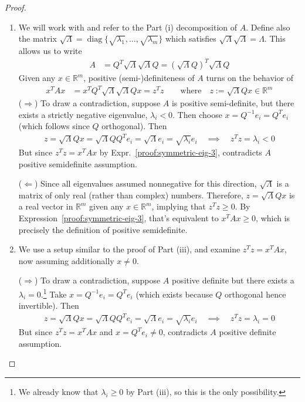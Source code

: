 \documentclass[12pt]{book}
\numberwithin{equation}{section} %
\theoremstyle{plain}
\theoremstyle{definition}
\theoremstyle{remark}
\newcommand{\diag}{\operatorname{diag}}
\newcommand{\Rm}{\mathbb{R}^m}
\begin{document}
\begin{proof}
\begin{enumerate}[label=(\roman*)]
  \item
    We will work with and refer to the Part (i) decomposition of $A$.
    Define also the matrix
    $\sqrt{\Lambda}=\diag\{\sqrt{\lambda_1},\ldots,\sqrt{\lambda_m}\}$
    which satisfies $\sqrt{\Lambda}\sqrt{\Lambda}=\Lambda$.
    This allows us to write
    \begin{align*}
      A &= Q^T \sqrt{\Lambda} \sqrt{\Lambda} Q
      = \left(\sqrt{\Lambda} Q\right)^T \sqrt{\Lambda} Q
    \end{align*}
    Given any $x\in\Rm$, positive (semi-)definiteness of $A$ turns on
    the behavior of
    \begin{align}
      x^T A x &=
      x^T Q^T \sqrt{\Lambda} \sqrt{\Lambda} Q x
      = z^Tz
      \qquad\text{where}\quad
      z := \sqrt{\Lambda}Qx\in\Rm
      \label{proof:symmetric-eig-3}
    \end{align}
    ($\Rightarrow$)
    To draw a contradiction, suppose $A$ is positive semi-definite, but
    there exists a strictly negative eigenvalue, $\lambda_i<0$.
    Then choose $x=Q^{-1}e_i = Q^Te_i$ (which follows since $Q$
    orthogonal). Then
    \begin{align*}
      z=\sqrt{\Lambda}Qx
      =\sqrt{\Lambda}QQ^Te_i
      =\sqrt{\Lambda}e_i
      = \sqrt{\lambda_i}e_i
      \quad\implies\quad
      z^Tz = \lambda_i<0
    \end{align*}
    But since $z^Tz=x^TAx$ by Expr.~\ref{proof:symmetric-eig-3},
    contradicts $A$ positive semidefinite assumption.

    ($\Leftarrow$)
    Since all eigenvalues assumed nonnegative for this direction,
    $\sqrt{\Lambda}$ is a matrix of only real (rather than complex)
    numbers. Therefore, $z = \sqrt{\Lambda} Qx$ is a real vector in
    $\Rm$ given any $x\in\Rm$, implying that
    $z^Tz\geq 0$.
    By Expression~\ref{proof:symmetric-eig-3}, that's equivalent to
    $x^TAx\geq 0$, which is precisely the definition of positive
    semidefinite.

  \item
    We use a setup similar to the proof of Part (iii),
    and examine $z^Tz=x^TAx$, now assuming additionally $x\neq 0$.

    ($\Rightarrow$)
    To draw a contradiction, suppose $A$ positive definite but there
    exists a $\lambda_i=0$.\footnote{%
      We already know that $\lambda_i\geq 0$ by Part (iii), so this is
      the only possibility.
    }
    Take $x=Q^{-1}e_i=Q^Te_i$ (which exists because $Q$ orthogonal hence
    invertible). Then
    \begin{align*}
      z
      = \sqrt{\Lambda}Qx
      = \sqrt{\Lambda}QQ^Te_i
      = \sqrt{\Lambda}e_i
      = \sqrt{\lambda_i}e_i
      \quad\implies\quad
      z^Tz = \lambda_i = 0
    \end{align*}
    But since $z^Tz=x^TAx$ and $x=Q^Te_i\neq 0$, contradicts $A$
    positive definite assumption.


\end{enumerate}
\end{proof}
\end{document}
